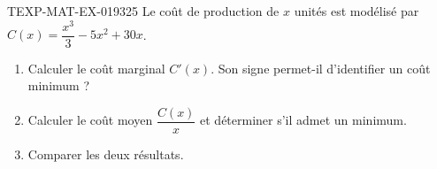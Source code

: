 \begin{exercice}{TEXP-MAT-EX-019}{3}{25}
Le coût de production de $x$ unités est modélisé par $C(x) = \dfrac{x^3}{3} - 5x^2 + 30x$.
\begin{enumerate}
  \item Calculer le coût marginal $C'(x)$. Son signe permet-il d'identifier un coût minimum ?
  \item Calculer le coût moyen $\dfrac{C(x)}{x}$ et déterminer s'il admet un minimum.
  \item Comparer les deux résultats.
\end{enumerate}

\end{exercice}
